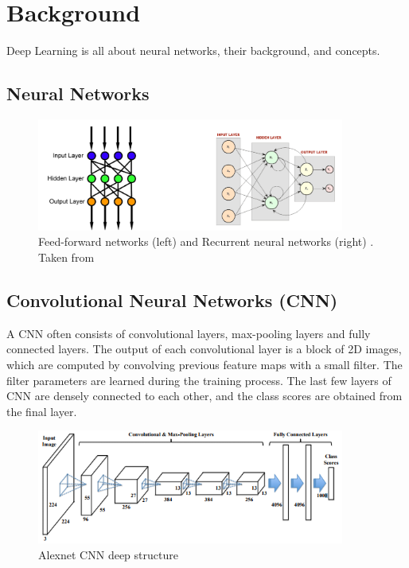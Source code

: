 \documentclass[12pt]{article}
\numberwithin{equation}{section}
\numberwithin{table}{section}
\numberwithin{figure}{section}
\begin{document}
\section{Background} \label{secimport}

Deep Learning is all about neural networks, their background, and concepts.

\subsection{Neural Networks}

\begin{figure}[H] \centering
	\includegraphics[width=0.9\textwidth]{image7.png}
	\caption{Feed-forward networks (left) and Recurrent neural networks (right) .  Taken from  }
	\label{figre7}
\end{figure}


\subsection{Convolutional Neural Networks (CNN)}

A CNN often consists of convolutional layers, max-pooling layers and fully connected layers. The output of each convolutional layer is a block of 2D images, which are computed by convolving previous feature maps with a small filter. The filter parameters are learned during the training process. The last few layers of CNN are densely connected to each other, and the class scores are obtained from the final layer.


\begin{figure}[H] \centering
	\includegraphics[width=0.9\textwidth]{alexnet.png}
	\caption{Alexnet CNN deep structure}
	\label{alex}
\end{figure}
\end{document}
